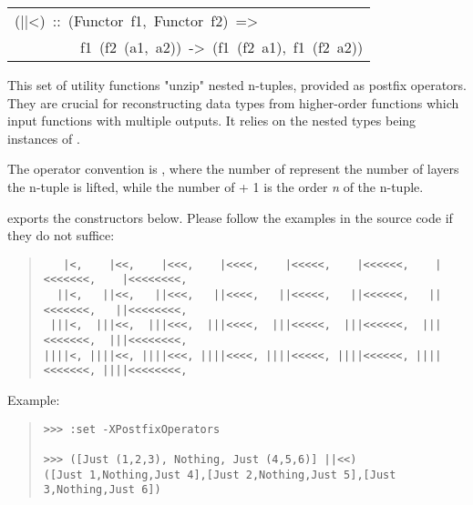 \begin{haddockdesc}
\item[\begin{tabular}{@{}l}
(||<)\ ::\ (Functor\ f1,\ Functor\ f2)\ =>\\\ \ \ \ \ \ \ \ \ f1\ (f2\ (a1,\ a2))\ ->\ (f1\ (f2\ a1),\ f1\ (f2\ a2))
\end{tabular}]\haddockbegindoc
This set of utility functions "unzip" nested n-tuples, provided
 as postfix operators. They are crucial for reconstructing data
 types from higher-order functions which input functions with
 multiple outputs. It relies on the nested types being instances of
 .\par
The operator convention is \haddocktt{(|+<+)}, where the number of \haddocktt{|}
 represent the number of layers the n-tuple is lifted, while the
 number of \haddocktt{<} + 1 is the order \emph{n} of the n-tuple.\par
{} exports the constructors below. Please
 follow the examples in the source code if they do not suffice:\par
\begin{quote}
{\haddockverb\begin{verbatim}
   |<,    |<<,    |<<<,    |<<<<,    |<<<<<,    |<<<<<<,    |<<<<<<<,    |<<<<<<<<,
  ||<,   ||<<,   ||<<<,   ||<<<<,   ||<<<<<,   ||<<<<<<,   ||<<<<<<<,   ||<<<<<<<<,
 |||<,  |||<<,  |||<<<,  |||<<<<,  |||<<<<<,  |||<<<<<<,  |||<<<<<<<,  |||<<<<<<<<,  
||||<, ||||<<, ||||<<<, ||||<<<<, ||||<<<<<, ||||<<<<<<, ||||<<<<<<<, ||||<<<<<<<<, \end{verbatim}}
\end{quote}
Example:\par
\begin{quote}
{\haddockverb\begin{verbatim}
>>> :set -XPostfixOperators

>>> ([Just (1,2,3), Nothing, Just (4,5,6)] ||<<)
([Just 1,Nothing,Just 4],[Just 2,Nothing,Just 5],[Just 3,Nothing,Just 6])

\end{verbatim}}
\end{quote}
\end{haddockdesc}
